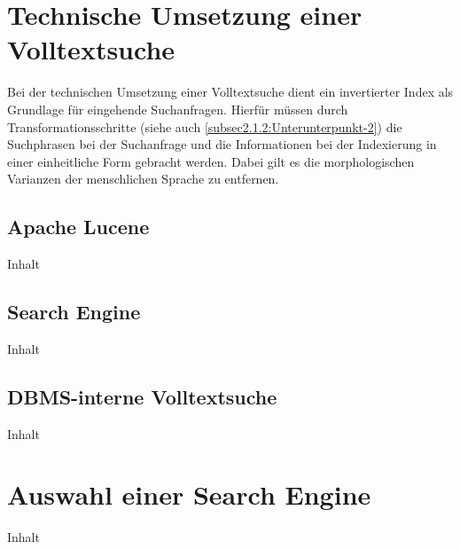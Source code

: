 

\section{Technische Umsetzung einer Volltextsuche\label{sec4.1:Unterpunkt-1}}

Bei der technischen Umsetzung einer Volltextsuche dient ein invertierter Index als Grundlage für eingehende Suchanfragen. Hierfür müssen durch Transformationsschritte (siehe auch \autoref{subsec2.1.2:Unterunterpunkt-2}) die Suchphrasen bei der Suchanfrage und die Informationen bei der Indexierung in einer einheitliche Form gebracht werden. Dabei gilt es die morphologischen Varianzen der menschlichen Sprache zu entfernen.

\subsection{Apache Lucene\label{subsec4.1.1:Unterunterpunkt-1}}

Inhalt

\subsection{Search Engine\label{subsec4.1.2:Unterunterpunkt-2}}

Inhalt

\subsection{DBMS-interne Volltextsuche\label{subsec4.1.3:Unterunterpunkt-3}}

Inhalt

\section{Auswahl einer Search Engine\label{sec4.2:Unterpunkt-2}}

Inhalt

